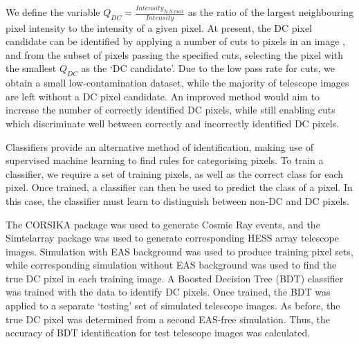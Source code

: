 \documentclass[]{article}
\begin{document}
We define the variable $Q_{DC} = \frac{Intensity_{N.N.max}}{Intensity}$ as the ratio of the largest neighbouring pixel intensity to the intensity of a given pixel. At present, the DC pixel candidate can be identified by applying a number of cuts to pixels in an image \cite{hess07}, and from the subset of pixels passing the specified cuts, selecting the pixel with the smallest $Q_{DC}$ as the \textquoteleft DC candidate'. Due to the low pass rate for cuts, we obtain a small low-contamination dataset, while the majority of telescope images are left without a DC pixel candidate. An improved method would aim to increase the number of correctly identified DC pixels, while still enabling cuts which discriminate well between correctly and incorrectly identified DC pixels.

Classifiers provide an alternative method of identification, making use of supervised machine learning to find rules for categorising pixels. To train a classifier, we require a set of training pixels, as well as the correct class for each pixel. Once trained, a classifier can then be used to predict the class of a pixel. In this case, the classifier must learn to distinguish between non-DC and DC pixels. 

The CORSIKA package \cite{Heck98} was used to generate Cosmic Ray events, and the Sim\textunderscore telarray package  \cite{Bernlohr08} was used to generate corresponding HESS array telescope images.  Simulation with EAS background was used to produce training pixel sets, while corresponding simulation without EAS background was used to find the true DC pixel in each training image. A Boosted Decision Tree (BDT) classifier was trained with the data to identify DC pixels. Once trained, the BDT was applied to a separate \textquoteleft testing' set of simulated telescope images. As before, the true DC pixel was determined from a second EAS-free simulation. Thus, the accuracy of BDT identification for test telescope images was calculated.
\end{document}
